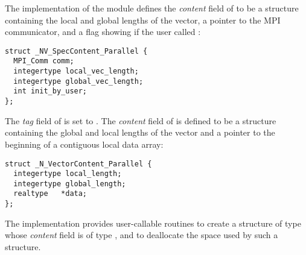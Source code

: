 %
The {\nvecp} implementation of the {\nvector} module
defines the {\em content} field of  to be a structure 
containing the local and global lengths of the vector, a pointer to the MPI
communicator, and a flag showing if the user called :
\begin{verbatim}
struct _NV_SpecContent_Parallel {
  MPI_Comm comm;
  integertype local_vec_length;
  integertype global_vec_length;
  int init_by_user;
};
\end{verbatim}
The {\em tag} field of  is set to .
The {\em content} field of  is defined to be a structure containing
the global and local lengths of the vector and a pointer to the beginning 
of a contiguous local data array:
\begin{verbatim} 
struct _N_VectorContent_Parallel {
  integertype local_length;
  integertype global_length;
  realtype   *data;
};
\end{verbatim}

The {\nvecp} implementation provides user-callable routines  
to create a structure of type  whose {\em content} field is
of type , and  
to deallocate the space used by such a structure. 

